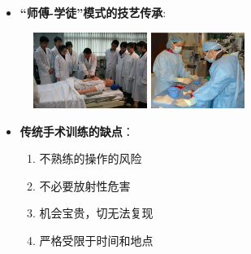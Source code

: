 \begin{frame}
\begin{itemize}
  \item \textbf{“师傅-学徒”模式的技艺传承}: 
\end{itemize}
\begin{figure}
\centering
\includegraphics[height=70pt]{../../Figures/background/clinical_training_center.eps}
\quad
\includegraphics[height=70pt]{../../Figures/background/cath_lab.eps}
\end{figure}

\begin{itemize}
  \item \textbf{传统手术训练的缺点}：
  \begin{enumerate}
     \item 不熟练的操作的风险
     \item 不必要放射性危害
     \item 机会宝贵，切无法复现
     \item 严格受限于时间和地点
  \end{enumerate}
\end{itemize}
\end{frame}

